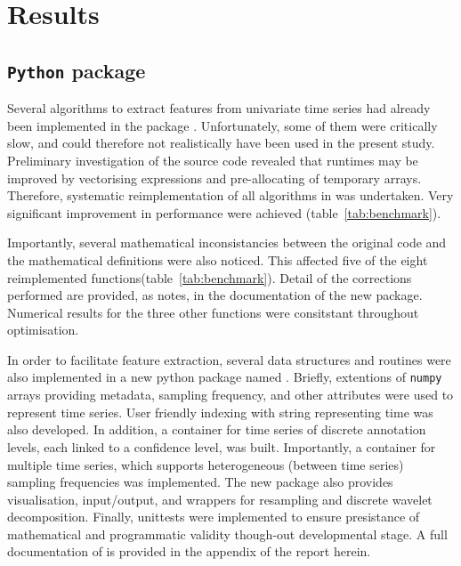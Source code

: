 \section{Results} \label{results}

\subsection{\texttt{Python} package}
Several algorithms to extract features from univariate time series had already been implemented in the \py{} package \pyeeg{}\citationneeded{}.
Unfortunately, some of them were critically slow, and could therefore not realistically have been used in the present study.
Preliminary investigation of the source code revealed that runtimes may be improved by vectorising expressions and pre-allocating of temporary arrays.
Therefore, systematic reimplementation of all algorithms in \pyeeg{} was undertaken.
Very significant improvement in performance were achieved (table~\ref{tab:benchmark}).



Importantly, several mathematical inconsistancies between the original code and the mathematical definitions were also noticed.
This affected five of the eight reimplemented functions(table~\ref{tab:benchmark}). 
Detail of the corrections performed are provided, as notes, in the documentation of the new package.
Numerical results for the three other functions were consitstant throughout optimisation.

In order to facilitate feature extraction, several data structures and routines were also implemented 
in a new python package named \pr{}.
Briefly, extentions of \texttt{numpy} arrays providing metadata, sampling frequency, and other attributes were used to represent time series.
User friendly indexing with string representing time was also developed.
In addition, a container for time series of discrete annotation levels, each linked to a confidence level, was built.
Importantly, a container for multiple time series, which supports heterogeneous (between time series) sampling frequencies was implemented.
The new package also provides visualisation, input/output, and wrappers for resampling and discrete wavelet decomposition.
Finally, unittests were implemented to ensure presistance of mathematical and programmatic validity though-out developmental stage.
A full documentation of \pr{} is provided in the appendix of the report herein.

